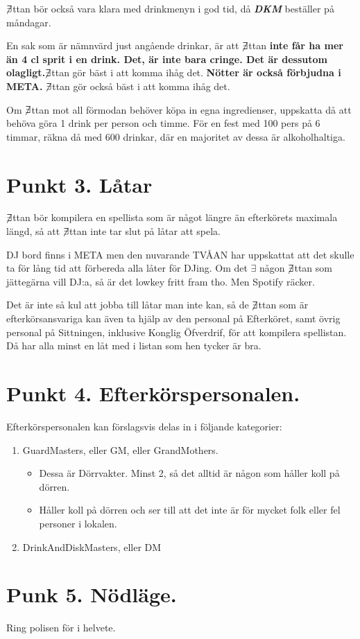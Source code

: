 \documentclass[a4paper, 12pt]{article}
\begin{document}
$\centernot\exists$ttan bör också vara klara med drinkmenyn i god tid, då \textit{\textbf{DKM}} beställer på måndagar.

En sak som är nämnvärd just angående drinkar, är att $\centernot\exists$ttan \textbf{inte får ha mer än 4 cl sprit i en drink. Det, är inte bara cringe. Det är dessutom olagligt.}$\centernot\exists$ttan gör bäst i att komma ihåg det. \textbf{Nötter är också förbjudna i META.} $\centernot\exists$ttan gör också bäst i att komma ihåg det.

Om $\centernot\exists$ttan mot all förmodan behöver köpa in egna ingredienser, uppskatta då att behöva göra 1 drink per person och timme. För en fest med 100 pers på 6 timmar, räkna då med 600 drinkar, där en majoritet av dessa är alkoholhaltiga.

\section{Punkt 3. Låtar}

$\centernot\exists$ttan bör kompilera en spellista som är något längre än efterkörets maximala längd, så att $\centernot\exists$ttan inte tar slut på låtar att spela.

DJ bord finns i META men den nuvarande TVÅAN har uppskattat att det skulle ta för lång tid att förbereda alla låter för DJing. Om det $\exists$ någon $\centernot\exists$ttan som jättegärna vill DJ:a, så är det lowkey fritt fram tho. Men Spotify räcker.

Det är inte så kul att jobba till låtar man inte kan, så de $\centernot\exists$ttan som är efterkörsansvariga kan även ta hjälp av den personal på Efterköret, samt övrig personal på Sittningen, inklusive Konglig Öfverdrif, för att kompilera spellistan. Då har alla minst en låt med i listan som hen tycker är bra.

\section{Punkt 4. Efterkörspersonalen.}

Efterkörspersonalen kan förslagsvis delas in i följande kategorier:

\begin{enumerate}
    \item GuardMasters, eller GM, eller GrandMothers.\begin{itemize}
        \item Dessa är Dörrvakter. Minst 2, så det alltid är någon som håller koll på dörren.
        \item Håller koll på dörren och ser till att det inte är för mycket folk eller fel personer i lokalen.
    \end{itemize}
    \item DrinkAndDiskMasters, eller DM
\end{enumerate}


\section{Punk 5. Nödläge.}

Ring polisen för i helvete. 
\end{document}
